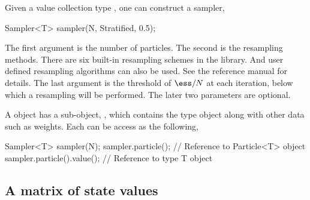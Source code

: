 Given a value collection type , one can construct a sampler,
\begin{cppcode}
Sampler<T> sampler(N, Stratified, 0.5);
\end{cppcode}
The first argument is the number of particles. The second is the resampling
methods. There are six built-in resampling schemes in the library. And user
defined resampling algorithms can also be used. See the reference manual for
details. The last argument is the threshold of $\ess/N$ at each iteration,
below which a resampling will be performed. The later two parameters are
optional.

A  object has a sub-object, ,
which contains the type  object along with other data such as
weights. Each can be access as the following,
\begin{cppcode}
Sampler<T> sampler(N);
sampler.particle();         // Reference to Particle<T> object
sampler.particle().value(); // Reference to type T object
\end{cppcode}

\subsection{A matrix of state values}
\label{sub:A matrix of state values}

